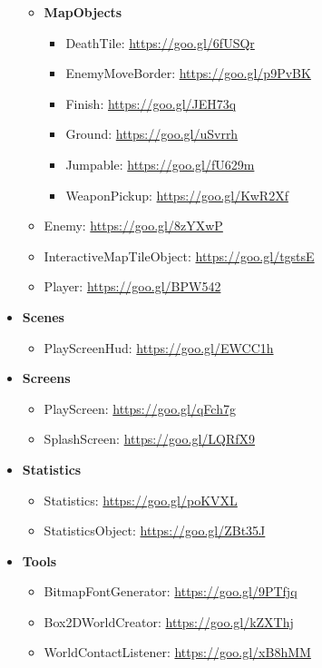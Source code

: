 \documentclass[12p]{article}
\begin{document}
\begin{itemize}
\begin{itemize}
        \item[\faFolderOpen] \textbf{MapObjects}
        \begin{itemize}
            \item DeathTile: \url{https://goo.gl/6fUSQr}
            \item EnemyMoveBorder: \url{https://goo.gl/p9PvBK}
            \item Finish: \url{https://goo.gl/JEH73q}
            \item Ground: \url{https://goo.gl/uSvrrh}
            \item Jumpable: \url{https://goo.gl/fU629m}
            \item WeaponPickup: \url{https://goo.gl/KwR2Xf}
        \end{itemize}
        
        \item Enemy: \url{https://goo.gl/8zYXwP}
        \item InteractiveMapTileObject: \url{https://goo.gl/tgstsE}
        \item Player: \url{https://goo.gl/BPW542}
    \end{itemize}
    
    \item \textbf{Scenes}
    \begin{itemize}
        \item PlayScreenHud: \url{https://goo.gl/EWCC1h}
    \end{itemize}
    
    \item \textbf{Screens}
    \begin{itemize}
        \item PlayScreen: \url{https://goo.gl/qFch7g}
        \item SplashScreen: \url{https://goo.gl/LQRfX9}
    \end{itemize}
    
    \item \textbf{Statistics}
    \begin{itemize}
        \item Statistics: \url{https://goo.gl/poKVXL}
        \item StatisticsObject: \url{https://goo.gl/ZBt35J}
    \end{itemize}
    
    \item \textbf{Tools}
    \begin{itemize}
        \item BitmapFontGenerator: \url{https://goo.gl/9PTfjq}
        \item Box2DWorldCreator: \url{https://goo.gl/kZXThj}
        \item WorldContactListener: \url{https://goo.gl/xB8hMM}
    \end{itemize}
    

\end{itemize}
\end{document}
